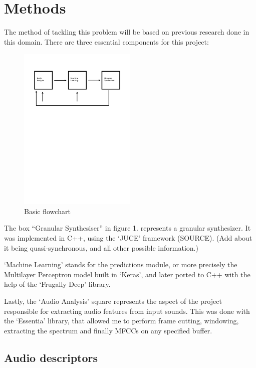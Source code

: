 \chapter{Methods}

The method of tackling this problem will be based on previous research done in this domain. There are three essential components for this project:
\begin{figure}[h]
\caption{Basic flowchart}
\centering
\includegraphics[width=0.5\textwidth]{images/flowchart}
\end{figure}

The box ``Granular Synthesiser'' in figure 1. represents a granular synthesizer.
It was implemented in C++, using the `JUCE' framework (SOURCE). (Add about it being
quasi-synchronous, and all other possible information.)

`Machine Learning' stands for the predictions module, or more
precisely the Multilayer Perceptron model built in `Keras', and later
ported to C++ with the help of the `Frugally Deep' library.

Lastly, the `Audio Analysis' square represents the aspect of the
project responsible for extracting audio features from input
sounds. This was done with the `Essentia' library, that allowed me to
perform frame cutting, windowing, extracting the spectrum and finally
MFCCs on any specified buffer.

\section{Audio descriptors}

